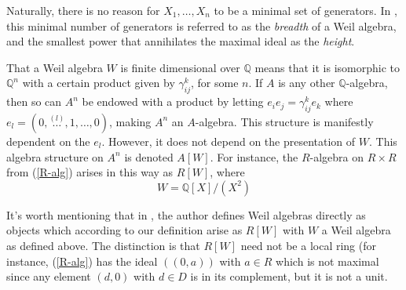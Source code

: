 \documentclass[11pt]{article}
\theoremstyle{definition}
\numberwithin{equation}{section}
\begin{document}
Naturally, there is no reason for \( X_1,\dots,X_n \) to be a minimal set of generators. In \cite{lav96}, this minimal number of generators is referred to as the \emph{breadth} of a Weil algebra, and the smallest power that annihilates the maximal ideal as the \emph{height}.

That a Weil algebra \( W \) is finite dimensional over \( \mathbb{Q} \) means that it is isomorphic to \( \mathbb{Q}^n \) with a certain product given by \( \gamma_{ij}^k \), for some \( n \). If \( A \) is any other \( \mathbb{Q} \)-algebra, then so can \( A^n \) be endowed with a product by letting \( e_ie_j = \gamma_{ij}^ke_k \) where \( e_l = (0,\stackrel{(l)}{\dots},1,\dots,0) \), making \( A^n \) an \( A \)-algebra. This structure is manifestly dependent on the \( e_l \). However, it does not depend on the presentation of \( W \). This algebra structure on \( A^n \) is denoted \( A[W] \). For instance, the \( R \)-algebra on \( R\times R \) from (\ref{R-alg}) arises in this way as \( R[W] \), where
\begin{equation*}
  W = \mathbb{Q}[X]/(X^2)
\end{equation*}

It's worth mentioning that in \cite{lav96}, the author defines Weil algebras directly as objects which according to our definition arise as \( R[W] \) with \( W \) a Weil algebra as defined above. The distinction is that \( R[W] \) need not be a local ring (for instance, (\ref{R-alg}) has the ideal \( ((0,a)) \) with \( a\in R \) which is not maximal since any element \( (d,0) \) with \( d\in D \) is in its complement, but it is not a unit.





\clearpage


\end{document}
